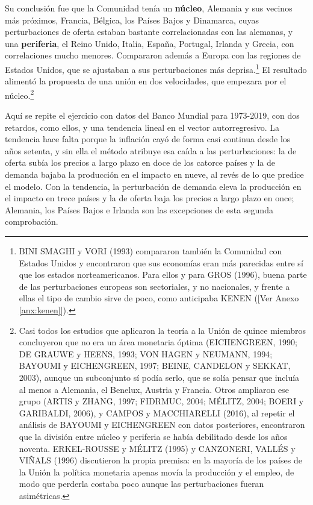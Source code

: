 \documentclass[10pt,a4paper]{article}
\newcommand{\authorfont}[1]{{\fontfamily{EBGaramond-TLF}\selectfont #1}}
\begin{document}
Su conclusión fue que la Comunidad tenía un \textbf{núcleo}, Alemania y sus vecinos más próximos, Francia, Bélgica, los Países Bajos y Dinamarca, cuyas perturbaciones de oferta estaban bastante correlacionadas con las alemanas, y una \textbf{periferia}, el Reino Unido, Italia, España, Portugal, Irlanda y Grecia, con correlaciones mucho menores. Compararon además a Europa con las regiones de Estados Unidos, que se ajustaban a sus perturbaciones más deprisa.\footnote{%
    BINI SMAGHI y VORI (1993) compararon también la Comunidad con Estados Unidos y encontraron que sus economías eran más parecidas entre sí que los estados norteamericanos. Para ellos y para GROS (1996), buena parte de las perturbaciones europeas son sectoriales, y no nacionales, y frente a ellas el tipo de cambio sirve de poco, como anticipaba KENEN ([\authorfont{Ver Anexo \ref{anx:kenen}}]).
} El resultado alimentó la propuesta de una unión en dos velocidades, que empezara por el núcleo.\footnote{%
    Casi todos los estudios que aplicaron la teoría a la Unión de quince miembros concluyeron que no era un área monetaria óptima (EICHENGREEN, 1990; DE GRAUWE y HEENS, 1993; VON HAGEN y NEUMANN, 1994; BAYOUMI y EICHENGREEN, 1997; BEINE, CANDELON y SEKKAT, 2003), aunque un subconjunto sí podía serlo, que se solía pensar que incluía al menos a Alemania, el Benelux, Austria y Francia. Otros ampliaron ese grupo (ARTIS y ZHANG, 1997; FIDRMUC, 2004; MÉLITZ, 2004; BOERI y GARIBALDI, 2006), y CAMPOS y MACCHIARELLI (2016), al repetir el análisis de BAYOUMI y EICHENGREEN con datos posteriores, encontraron que la división entre núcleo y periferia se había debilitado desde los años noventa. ERKEL-ROUSSE y MÉLITZ (1995) y CANZONERI, VALLÉS y VIÑALS (1996) discutieron la propia premisa: en la mayoría de los países de la Unión la política monetaria apenas movía la producción y el empleo, de modo que perderla costaba poco aunque las perturbaciones fueran asimétricas.
}

Aquí se repite el ejercicio con datos del Banco Mundial para 1973-2019, con dos retardos, como ellos, y una tendencia lineal en el vector autorregresivo. La tendencia hace falta porque la inflación cayó de forma casi continua desde los años setenta, y sin ella el método atribuye esa caída a las perturbaciones: la de oferta subía los precios a largo plazo en doce de los catorce países y la de demanda bajaba la producción en el impacto en nueve, al revés de lo que predice el modelo. Con la tendencia, la perturbación de demanda eleva la producción en el impacto en trece países y la de oferta baja los precios a largo plazo en once; Alemania, los Países Bajos e Irlanda son las excepciones de esta segunda comprobación.
\end{document}
